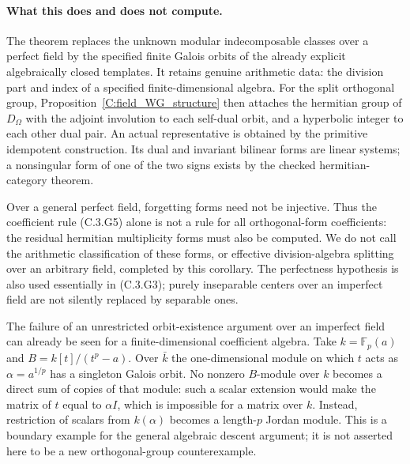 \paragraph{What this does and does not compute.}
The theorem replaces the unknown modular indecomposable classes over
a perfect field by the specified finite Galois orbits of the already
explicit algebraically closed templates. It retains genuine arithmetic
data: the division part and index of a specified finite-dimensional
algebra. For the split orthogonal group, Proposition~\ref{C:field_WG_structure}
then attaches the hermitian group of $D_\Omega$ with the adjoint
involution to each self-dual orbit, and a hyperbolic integer to each
other dual pair. An actual representative is obtained by the primitive
idempotent construction. Its dual and invariant bilinear forms are
linear systems; a nonsingular form of one of the two signs exists
by the checked hermitian-category theorem.

Over a general perfect field, forgetting forms need not be injective.
Thus the coefficient rule (C.3.G5) alone is not a rule for all
orthogonal-form coefficients: the residual hermitian multiplicity
forms must also be computed. We do not call the arithmetic
classification of these forms, or effective division-algebra splitting
over an arbitrary field, completed by this corollary. The perfectness
hypothesis is also used essentially in (C.3.G3); purely inseparable
centers over an imperfect field are not silently replaced by
separable ones.

The failure of an unrestricted orbit-existence argument over an
imperfect field can already be seen for a finite-dimensional
coefficient algebra. Take $k=\mathbb F_p(a)$ and
$B=k[t]/(t^p-a)$. Over $\bar k$ the one-dimensional module on
which $t$ acts as $\alpha=a^{1/p}$ has a singleton Galois orbit.
No nonzero $B$-module over $k$ becomes a direct sum of copies of
that module: such a scalar extension would make the matrix of $t$
equal to $\alpha I$, which is impossible for a matrix over $k$.
Instead, restriction of scalars from $k(\alpha)$ becomes a
length-$p$ Jordan module. This is a boundary example for the
general algebraic descent argument; it is not asserted here to
be a new orthogonal-group counterexample.
